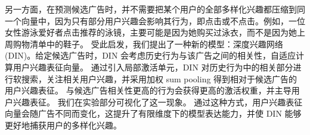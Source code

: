  

另一方面，在预测候选广告时，并不需要把某个用户的全部多样化兴趣都压缩到同一个向量中，因为只有部分用户兴趣会影响其行为，即点击或不点击。例如，一位女性游泳爱好者点击推荐的泳镜，主要可能是因为她购买过泳衣，而不是因为她上周购物清单中的鞋子。
受此启发，我们提出了一种新的模型：深度兴趣网络 (DIN)。给定候选广告时，DIN 会考虑历史行为与该广告之间的相关性，自适应计算用户兴趣表征向量。
通过引入局部激活单元，DIN 对历史行为中的相关部分进行软搜索，关注相关用户兴趣，并采用加权 sum pooling 得到相对于候选广告的用户兴趣表征。
与候选广告相关性更高的行为会获得更高的激活权重，并主导用户兴趣表征。
我们在实验部分可视化了这一现象。
通过这种方式，用户兴趣表征向量会随广告不同而变化，这提升了有限维度下的模型表达能力，并使 DIN 能够更好地捕获用户的多样化兴趣。


